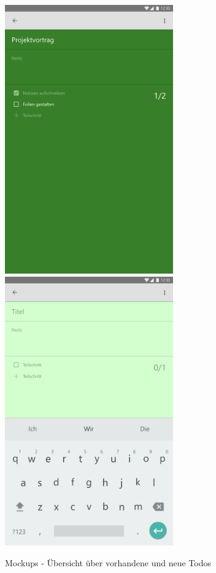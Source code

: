\begin{figure}[H]
\centering
\begin{minipage}[t]{1\textwidth} %
\caption{Mockups - Übersicht über vorhandene und neue Todos} %
\includegraphics[width=7.25cm]{img/ToDoActivity} %
\includegraphics[width=7.25cm]{img/ToDoActivityNew}\\ %
\end{minipage}
\end{figure}

